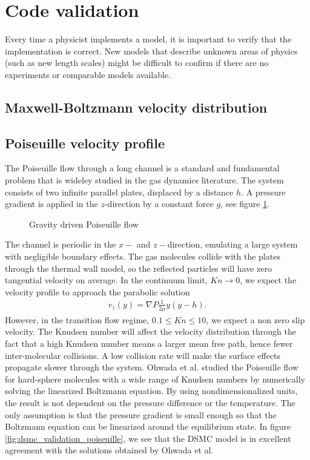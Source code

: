 \section{Code validation}
Every time a physicist implements a model, it is important to verify that the implementation is correct. New models that describe unknown areas of physics (such as new length scales) might be difficult to confirm if there are no experiments or comparable models available. 
\subsection{Maxwell-Boltzmann velocity distribution}

\subsection{Poiseuille velocity profile}
The Poiseuille flow through a long channel is a standard and fundamental problem that is wideley studied in the gas dynamics literature. The system consists of two infinite parallel plates, displaced by a distance $h$. A pressure gradient is applied in the $z$-direction by a constant force $g$, see figure \ref{fig:dsmc_validation_poiseuille_system}. 

\begin{figure}[htp]
\centering
\label{fig:dsmc_validation_poiseuille_system}
\caption{Gravity driven Poiseuille flow}
\end{figure}

The channel is periodic in the $x-$ and $z-$direction, emulating a large system with negligible boundary effects. The gas molecules collide with the plates through the thermal wall model, so the reflected particles will have zero tangential velocity on average. In the continuum limit, $Kn\rightarrow 0$, we expect the velocity profile to approach the parabolic solution \cite{batchelor2000introduction}
\begin{align}
	v_z(y) = \nabla P\frac{1}{2\mu}y(y-h).
\end{align}
However, in the transition flow regime, $0.1 \leq Kn \leq 10$, we expect a non zero slip velocity\cite{morris1992slip}. The Knudsen number will affect the velocity distribution through the fact that a high Knudsen number means a larger mean free path, hence fewer inter-molecular collisions. A low collision rate will make the surface effects propagate slower through the system. Ohwada et al. \cite{ohwada1989numerical} studied the Poiseuille flow for hard-sphere molecules with a wide range of Knudsen numbers by numerically solving the linearized Boltzmann equation. By using nondimensionalized units, the result is not dependent on the pressure difference or the temperature. The only assumption is that the pressure gradient is small enough so that the Boltzmann equation can be linearized around the equilibrium state. In figure \ref{fig:dsmc_validation_poiseuille}, we see that the DSMC model is in excellent agreement with the solutions obtained by Ohwada et al.

